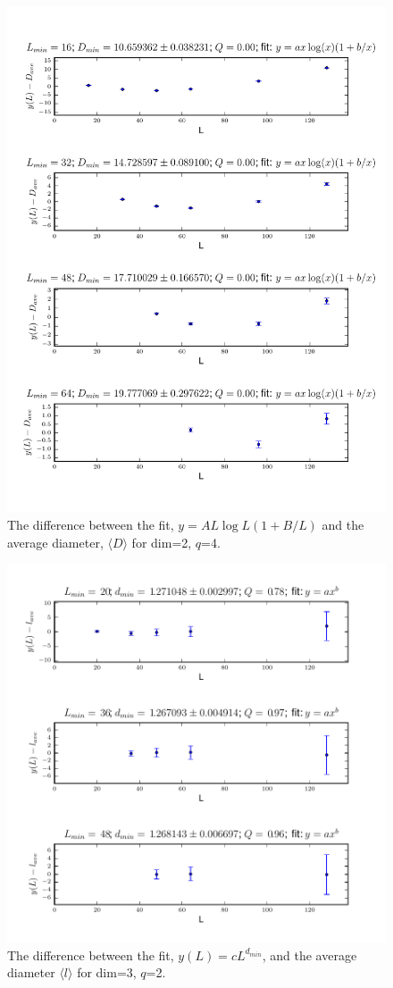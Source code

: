 \documentclass[pre,preprint]{revtex4}
\newcommand{\lb}{{\langle}}
\newcommand{\rb}{{\rangle}}
\begin{document}
\begin{figure}[htp]
\centering
\includegraphics[width=.9\textwidth]{figures/D_min_D2q4_46_log_fig}
\caption{The difference between the fit, $y=AL\log{L}(1+B/L)$ and the average diameter, $\lb D \rb$ for dim=2, $q$=4.}\label{fig:4}
\end{figure}



\begin{figure}[htp]
\centering
\includegraphics[width=.9\textwidth]{figures/d_min_D3q2_46_fig}
\caption{The difference between the fit, $y(L)=cL^{d_{min}}$, and the average diameter $\lb l \rb$ for dim=3, $q$=2.}\label{fig:4}
\end{figure}
\end{document}
